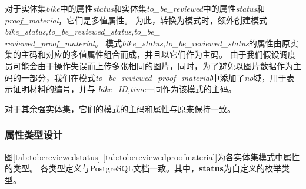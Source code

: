   对于实体集\textit{bike}中的属性\textit{status}和实体集\textit{to\_be\_reviewed}中的属性\textit{status}和\textit{proof\_material}，它们是多值属性。
  为此，转换为模式时，额外创建模式\textit{bike\_status,to\_be\_reviewed\_status},\textit{to\_be\_}\\\textit{reviewed\_proof\_material}。
  模式\textit{bike\_status,to\_be\_reviewed\_status}的属性由原实集的主码和对应的多值属性组合而成，并且以它们作为主码。
  由于我们假设调度员可能会由于操作失误而上传多张相同的图片，同时，为了避免以图片数据作为主码的一部分，我们在模式\textit{to\_be\_reviewed\_proof\_material}中添加了\textit{no}域，用于表示证明材料的编号，并与
  \textit{bike\_ID,time}一同作为该模式的主码。
  
  对于其余强实体集，它们的模式的主码和属性与原来保持一致。

  \subsubsection{属性类型设计}
图\ref{tab:tobereviewedstatus}-\ref{tab:tobereviewedproofmaterial}为各实体集模式中属性的类型。
各类型定义与PostgreSQL文档\cite{data}一致。其中，\textbf{status}为自定义的枚举类型。

